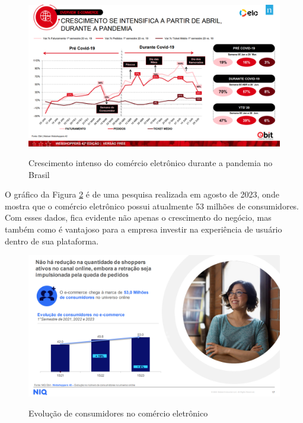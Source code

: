 \begin{figure}[ht]
    \centering
    \caption{Crescimento intenso do comércio eletrônico durante a pandemia no Brasil}
    \includegraphics[keepaspectratio=true,scale=0.3]{figuras/cap02edicao42a.png}
    \label{fig02}
\end{figure}

O gráfico da Figura \ref{fig03} é de uma pesquisa realizada em agosto de 2023, onde mostra que o comércio eletrônico possui atualmente 53 milhões de consumidores. Com esses dados, fica evidente não apenas o crescimento do negócio, mas também como é vantajoso para a empresa investir na experiência de usuário dentro de sua plataforma.

\begin{figure}[ht]
    \centering
    \caption{Evolução de consumidores no comércio eletrônico}
    \includegraphics[keepaspectratio=true,scale=0.3]{figuras/cap02edicao48.png}
    \label{fig03}
\end{figure}


